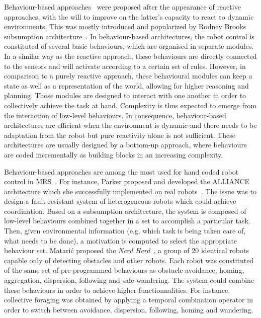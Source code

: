       Behaviour-based approaches~\parencite{Arkin1998} were proposed after the appearance of reactive approaches, with the will to improve on the latter's capacity to react to dynamic environments. This was mostly introduced and popularized by Rodney Brooks subsumption architecture~\parencite{Brooks1986}. In behaviour-based architectures, the robot control is constituted of several basic behaviours, which are organised in separate modules. In a similar way as the reactive approach, these behaviours are directly connected to the sensors and will activate according to a certain set of rules. However, in comparison to a purely reactive approach, these behavioural modules can keep a state as well as a representation of the world, allowing for higher reasoning and planning. Those modules are designed to interact with one another in order to collectively achieve the task at hand. Complexity is thus expected to emerge from the interaction of low-level behaviours. In consequence, behaviour-based architectures are efficient when the environment is dynamic and there needs to be adaptation from the robot but pure reactivity alone is not sufficient. These architectures are usually designed by a bottom-up approach, where behaviours are coded incrementally as building blocks in an increasing complexity. 

      Behaviour-based approaches are among the most used for hand coded robot control in MRS~\parencite{Arkin1998, Mataric2008, Parker2008}. For instance, Parker proposed and developed the ALLIANCE architecture which she successfully implemented on real robots~\parencite{Parker1994}. The issue was to design a fault-resistant system of heterogeneous robots which could achieve coordination. Based on a subsumption architecture, the system is composed of low-level behaviours combined together in a set to accomplish a particular task. Then, given environmental information (e.g. which task is being taken care of, what needs to be done), a motivation is computed to select the appropriate behaviour set. Matarić proposed the \emph{Nerd Herd}~\parencite{Mataric1995}, a group of $20$ identical robots capable only of detecting obstacles and other robots. Each robot was constituted of the same set of pre-programmed behaviours as obstacle avoidance, homing, aggregation, dispersion, following and safe wandering. The system could combine these behaviours in order to achieve higher functionnalities. For instance, collective foraging was obtained by applying a temporal combination operator in order to switch between avoidance, dispersion, following, homing and wandering. 

